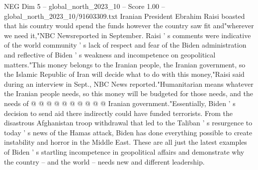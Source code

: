 \begin{textsample}{NEG Dim 5 – global\_north\_2023\_10 – Score 1.00 – global\_north\_2023\_10/91603309.txt}
Iranian President Ebrahim Raisi boasted that his country would spend the funds however the country saw fit and"wherever we need it,"NBC Newsreported in September.
Raisi ' s comments were indicative of the world community ' s lack of respect and fear of the Biden administration and reflective of Biden ' s weakness and incompetence on geopolitical matters."This money belongs to the Iranian people, the Iranian government, so the Islamic Republic of Iran will decide what to do with this money,"Raisi said during an interview in Sept., NBC News reported."Humanitarian means whatever the Iranian people needs, so this money will be budgeted for those needs, and the needs of @ @ @ @ @ @ @ @ @ @ Iranian government."Essentially, Biden ' s decision to send aid there indirectly could have funded terrorists.
From the disastrous Afghanistan troop withdrawal that led to the Taliban ' s resurgence to today ' s news of the Hamas attack, Biden has done everything possible to create instability and horror in the Middle East.
These are all just the latest examples of Biden ' s startling incompetence in geopolitical affairs and demonstrate why the country -- and the world -- needs new and different leadership.

\end{textsample}
